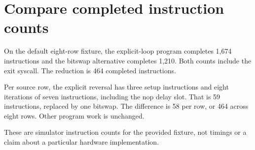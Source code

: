 \section{Compare completed instruction
  counts}\label{003-eight-byte-sprite-x-instruction-count-compare-completed-instruction-counts}

On the default eight-row fixture, the explicit-loop program completes
1,674 instructions and the bitswap alternative completes 1,210. Both
counts include the exit syscall. The reduction is 464 completed
instructions.

Per source row, the explicit reversal has three setup instructions and
eight iterations of seven instructions, including the nop delay slot.
That is 59 instructions, replaced by one bitswap. The difference is 58
per row, or 464 across eight rows. Other program work is unchanged.

These are simulator instruction counts for the provided fixture, not
timings or a claim about a particular hardware implementation.
